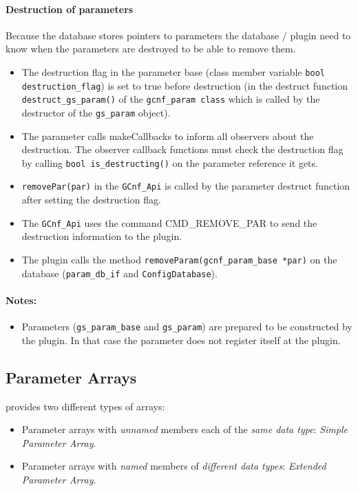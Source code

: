 \paragraph{Destruction of parameters}
Because the database stores pointers to parameters the database / plugin need to know when the parameters are destroyed to be able to remove them.
\begin{itemize}
    \item The destruction flag in the parameter base (class member variable \lstinline|bool destruction_flag|) is set to \textsf{true} before destruction (in the destruct function \lstinline|destruct_gs_param()| of the \lstinline|gcnf_param class| which is called by the destructor of the \lstinline|gs_param| object).
    \item The parameter calls makeCallbacks to inform all observers about the destruction. The observer callback functions must check the destruction flag by calling \lstinline|bool is_destructing()| on the parameter reference it gets.
    \item \lstinline|removePar(par)| in the \lstinline|GCnf_Api| is called by the parameter destruct function after setting the destruction flag.
    \item The \lstinline|GCnf_Api| uses the command CMD\_REMOVE\_PAR to send the destruction information to the plugin.
    \item The plugin calls the method \lstinline|removeParam(gcnf_param_base *par)| on the database (\lstinline|param_db_if| and \lstinline|ConfigDatabase|).
\end{itemize}


\paragraph{Notes:}
\begin{itemize}
  \item Parameters (\lstinline|gs_param_base| and \lstinline|gs_param|) are prepared to be constructed by the plugin. In that case the parameter does not register itself at the plugin.
\end{itemize}


\subsection{Parameter Arrays}

\GreenConfig provides two different types of arrays:
\begin{itemize}
    \item Parameter arrays with \textsl{unnamed} members each of the \textsl{same data type}: {\em Simple Parameter Array}.
    \item Parameter arrays with \textsl{named} members of \textsl{different data types}: {\em Extended Parameter Array}.
\end{itemize}


